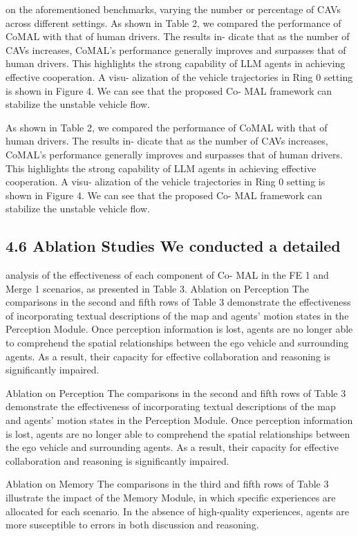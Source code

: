 \documentclass[12pt]{article}
\begin{document}
on the aforementioned benchmarks, varying the number
or percentage of CAVs across different settings.
As shown in Table 2, we compared the performance
of CoMAL with that of human drivers. The results in-
dicate that as the number of CAVs increases, CoMAL’s
performance generally improves and surpasses that of
human drivers. This highlights the strong capability of
LLM agents in achieving effective cooperation. A visu-
alization of the vehicle trajectories in Ring 0 setting is
shown in Figure 4. We can see that the proposed Co-
MAL framework can stabilize the unstable vehicle flow.


As shown in Table 2, we compared the performance
of CoMAL with that of human drivers. The results in-
dicate that as the number of CAVs increases, CoMAL’s
performance generally improves and surpasses that of
human drivers. This highlights the strong capability of
LLM agents in achieving effective cooperation. A visu-
alization of the vehicle trajectories in Ring 0 setting is
shown in Figure 4. We can see that the proposed Co-
MAL framework can stabilize the unstable vehicle flow.


\subsection{4.6 Ablation Studies We conducted a detailed}

analysis of the effectiveness of each component of Co-
MAL in the FE 1 and Merge 1 scenarios, as presented
in Table 3.
Ablation on Perception The comparisons in the
second and fifth rows of Table 3 demonstrate the
effectiveness of incorporating textual descriptions of
the map and agents’ motion states in the Perception
Module. Once perception information is lost, agents are
no longer able to comprehend the spatial relationships
between the ego vehicle and surrounding agents. As
a result, their capacity for effective collaboration and
reasoning is significantly impaired.


Ablation on Perception The comparisons in the
second and fifth rows of Table 3 demonstrate the
effectiveness of incorporating textual descriptions of
the map and agents’ motion states in the Perception
Module. Once perception information is lost, agents are
no longer able to comprehend the spatial relationships
between the ego vehicle and surrounding agents. As
a result, their capacity for effective collaboration and
reasoning is significantly impaired.


Ablation on Memory The comparisons in the
third and fifth rows of Table 3 illustrate the impact
of the Memory Module, in which specific experiences
are allocated for each scenario.
In the absence of
high-quality experiences, agents are more susceptible to
errors in both discussion and reasoning.
\end{document}

